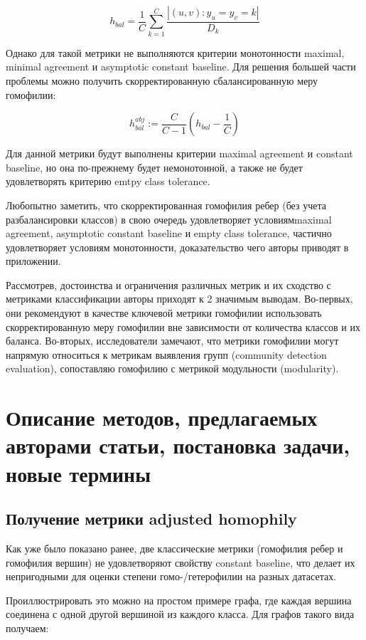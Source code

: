 \documentclass[a4paper,14pt]{article}
\begin{document}
	$$h_{bal} = \dfrac{1}{C}\sum_{k=1}^{C}\dfrac{|(u,v) : y_u = y_v = k|}{D_k}$$
	
	Однако для такой метрики не выполняются критерии монотонности maximal, minimal agreement и asymptotic constant baseline.
	Для решения большей части проблемы можно получить скорректированную сбалансированную меру гомофилии:
	
	$$h_{bal}^{abj} := \dfrac{C}{C - 1}\left( h_{bal} - \dfrac{1}{C}\right) $$
	
	Для данной метрики будут выполнены критерии maximal agreement и constant baseline, но она по-прежнему будет немонотонной, а также не будет удовлетворять критерию emtpy class tolerance. 
	
	Любопытно заметить, что скорректированная гомофилия ребер (без учета разбалансировки классов) в свою очередь удовлетворяет условиямmaximal agreement, asymptotic constant baseline и empty class tolerance, частично удовлетворяет условиям монотонности, доказательство чего авторы приводят в приложении.
	 
	Рассмотрев, достоинства и ограничения различных метрик и их сходство с метриками классификации авторы приходят к 2 значимым выводам.
	Во-первых, они рекомендуют в качестве ключевой метрики гомофилии использовать скорректированную меру гомофилии вне зависимости от количества классов и их баланса.
	Во-вторых, исследователи замечают, что метрики гомофилии могут напрямую относиться к метрикам выявления групп (community detection evaluation), сопоставляю гомофилию с метрикой модульности (modularity).
	
	
	\pagebreak
	\section{Описание методов, предлагаемых авторами статьи, постановка задачи, новые термины}
	\setcounter{figure}{0}
	
	\subsection{Получение метрики adjusted homophily}
	
	Как уже было показано ранее, две классические метрики (гомофилия ребер и гомофилия вершин) не удовлетворяют свойству constant baseline, что делает их непригодными для оценки степени гомо-/гетерофилии на разных датасетах.
	
	Проиллюстрировать это можно на простом примере графа, где каждая вершина соединена с одной другой вершиной из каждого класса.
	Для графов такого вида получаем:
	
\end{document}
